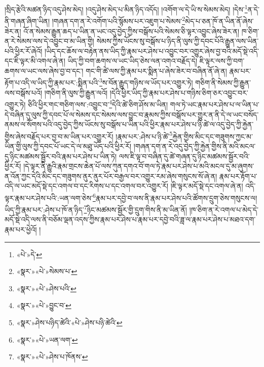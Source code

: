 །སྲིད་རྩེའི་མཚན་ཉིད་འདུ་ཤེས་མེད། །འདུ་ཤེས་མེད་པ་མིན་ཉིད་འདོད། །འགོག་ལ་དེ་ཡི་ས་སེམས་མེད། །དེས་\footnote{«པེ་»དེ་}ན་དེ་ནི་གཞན་ཞིག་ཡིན། །གཞན་དག་ན་རེ་འགོག་པའི་སྙོམས་པར་འཇུག་པ་སེམས་\footnote{«སྣར་»«པེ་»སེམས་པ་}མེད་པ་ཅན་ཁོ་ན་ཡིན་ནོ་ཞེས་ཟེར་ན། འོ་ན་སེམས་རྒྱུན་ཆད་པ་ཡིན་ན་ཡང་འདུ་བྱེད་ཀྱིས་བསྒོས་པའི་སེམས་ཅི་ལྟར་འབྱུང་ཞེས་ཟེར་ན། ཁ་ཅིག་ན་རེ་སེམས་ལས་དེ་འབྱུང་བ་མ་ཡིན་གྱི། སེམས་ཀྱིས་ཡོངས་སུ་བསྒོས་པ་ཉིད་ནི་ལུས་ཀྱི་དབང་པོའི་རྒྱུན་ལས་ཡིན་པའི་ཕྱིར་རོ་ཞེའོ། །ཡིད་དང་ཆོས་ལ་བརྟེན་ནས་ཡིད་ཀྱི་རྣམ་པར་ཤེས་པ་འབྱུང་བར་འགྱུར་ཞེས་བྱ་བའི་མདོ་སྡེ་འདི་དང་ཇི་ལྟར་མི་འགལ་ཞེ་ན། ཡིད་ཀྱི་བག་ཆགས་ལ་ཡང་ཡིད་ཅེས་ལན་འགའ་བརྗོད་དེ། ཇི་ལྟར་ལས་ཀྱི་བག་ཆགས་ལ་ཡང་ལས་ཞེས་བྱ་བ་དང་། གང་གི་ཚེ་ལས་ཀྱི་རྣམ་པར་སྨིན་པ་ཞེས་ཟེར་བ་བཞིན་ནོ་ཞེ་ན། རྣམ་པར་རྟོག་པ་འདི་ལ་ཡིད་ཀྱི་རྣམ་པར་:སྨིན་པའི་\footnote{«སྣར་»«པེ་»ཤེས་པའི་}ས་བོན་རྒྱུད་གཉིས་ལ་ཡོད་པར་འགྱུར་ཏེ། གཅིག་ནི་སེམས་ཀྱི་རྒྱུན་ལས་བསྒོས་པའོ། །གཅིག་ནི་ལུས་ཀྱི་རྒྱུན་ལའོ། །དེའི་ཕྱིར་ཡིད་ཀྱི་རྣམ་པར་ཤེས་པ་གཉིས་ཅིག་ཅར་འབྱུང་བར་འགྱུར་ཏེ། ཅིའི་ཕྱིར་གང་གཅིག་ལས་:འབྱུང་བ་\footnote{«སྣར་»«པེ་»བྱུང་བ་}དེའི་ཚེ་ཅིག་ཤོས་མ་ཡིན། གལ་ཏེ་ཡང་རྣམ་པར་ཤེས་པ་ལ་ཡིན་པ་དེ་བཞིན་དུ་ལུས་ཀྱི་དབང་པོ་ལ་སེམས་དང་སེམས་ལས་བྱུང་བ་རྣམས་ཀྱིས་བསྒོས་པར་གྱུར་ན་ནི་དེ་ལ་ཡང་བསོད་ནམས་ལ་སོགས་པའི་འདུ་བྱེད་ཀྱིས་ཡོངས་སུ་བསྒོས་པ་ཡིན་པའི་ཕྱིར་རྣམ་པར་ཤེས་པ་ཉི་ཚེ་ལ་འདུ་བྱེད་ཀྱི་རྐྱེན་གྱིས་ཞེས་བརྗོད་པར་བྱ་བ་མ་ཡིན་པར་འགྱུར་རོ། །རྣམ་པར་:ཤེས་པ་ཉི་ཚེ་\footnote{«སྣར་»ཤེས་པཉིད་ཚེའི་«པེ་»ཤེས་པཉི་ཚེའི་}རྐྱེན་གྱིས་མིང་དང་གཟུགས་ཀྱང་མ་ཡིན་གྱི་ལུས་ཀྱི་དབང་པོ་ཡང་དེ་ལ་མཐུ་ཡོད་པའི་ཕྱིར་རོ། །གཞན་དག་ན་རེ་འདུ་བྱེད་ཀྱི་རྐྱེན་གྱིས་ནི་མའི་མངལ་དུ་ཉིང་མཚམས་སྦྱོར་བའི་རྣམ་པར་ཤེས་པ་ཡིན་ཏེ། ལས་ཇི་ལྟ་བ་བཞིན་དུ་ཚེ་གཞན་དུ་ཉིང་མཚམས་སྦྱོར་བའི་ཕྱིར་རོ། །དེ་ལྟར་ནི་རྒྱུའི་རྣམ་གྲངས་ཆེན་པོ་ལས་ཀུན་དགའ་བོ་གལ་ཏེ་རྣམ་པར་ཤེས་པ་མའི་མངལ་དུ་མ་ཞུགས་ན་འོན་ཀྱང་དེའི་མིང་དང་གཟུགས་ནུར་ནུར་པོར་བརྒྱལ་བར་འགྱུར་རམ་ཞེས་གསུངས་སོ་ཞེ་ན། རྣམ་པར་རྟོག་པ་འདི་ལ་ཡང་མདོ་སྡེ་དང་འགལ་བ་དང་རིགས་པ་དང་འགལ་བར་འགྱུར་རོ། །ཇི་ལྟར་མདོ་སྡེ་དང་འགལ་ཞེ་ན། འདི་ལྟར་རྣམ་པར་ཤེས་པའི་:ཡན་ལག་ཅེས་\footnote{«སྣར་»«པེ་»ཡན་ལག་}རྣམ་པར་དབྱེ་བ་ལས་ནི་རྣམ་པར་ཤེས་པའི་ཚོགས་དྲུག་ཅེས་གསུངས་ལ། ཡིད་ཀྱི་རྣམ་པར་:ཤེས་པ་ཁོ་ན་ཉིད་\footnote{«སྣར་»«པེ་»ཤེས་པ་ཁོནས་}ཉིང་མཚམས་སྦྱོར་གྱི་དྲུག་གིས་ནི་མ་ཡིན་ནོ། །ཁ་ཅིག་ན་རེ་འགལ་པ་མེད་དེ་མདོ་སྡེ་འདི་ལས་ནི་བཅོམ་ལྡན་འདས་ཀྱིས་རྣམ་པར་ཤེས་པ་རྣམ་པར་དབྱེ་བའི་ཟླ་ལ་རྣམ་པར་ཤེས་པ་མཐའ་དག་རྣམ་པར་ཕྱེའོ། །
